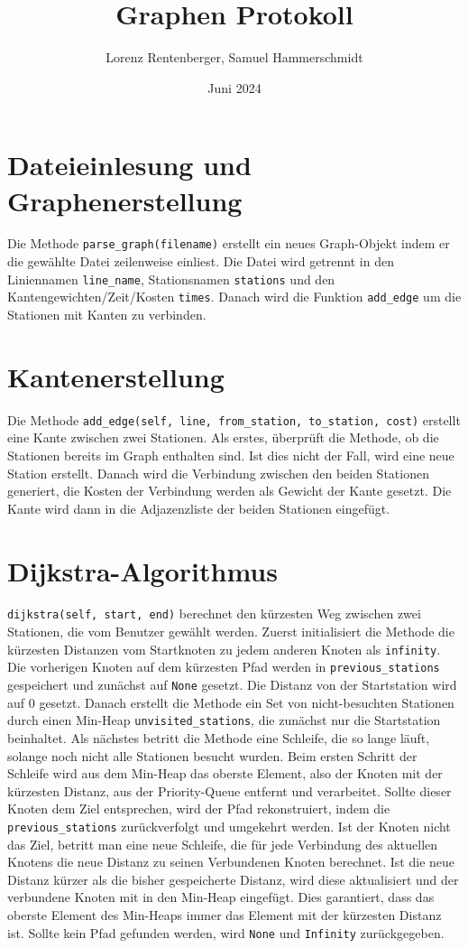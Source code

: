 \documentclass{article}
\title{Graphen Protokoll}
\author{Lorenz Rentenberger, Samuel Hammerschmidt}
\date{Juni 2024}
\begin{document}
\maketitle

\section*{Dateieinlesung und Graphenerstellung}
Die Methode \texttt{parse\_graph(filename)} erstellt ein neues Graph-Objekt indem er die gewählte Datei zeilenweise einliest. Die Datei wird getrennt in den Liniennamen \texttt{line\_name}, Stationsnamen \texttt{stations} und den Kantengewichten/Zeit/Kosten \texttt{times}.
Danach wird die Funktion \texttt{add\_edge} um die Stationen mit Kanten zu verbinden.

\section*{Kantenerstellung}
Die Methode \texttt{add\_edge(self, line, from\_station, to\_station, cost)} erstellt eine Kante zwischen zwei Stationen. Als erstes, überprüft die Methode, ob die Stationen bereits im Graph enthalten sind. Ist dies nicht der Fall, wird eine neue Station erstellt.
Danach wird die Verbindung zwischen den beiden Stationen generiert, die Kosten der Verbindung werden als Gewicht der Kante gesetzt. Die Kante wird dann in die Adjazenzliste der beiden Stationen eingefügt.

\section*{Dijkstra-Algorithmus}
\texttt{dijkstra(self, start, end)} berechnet den kürzesten Weg zwischen zwei Stationen, die vom Benutzer gewählt werden. Zuerst initialisiert die Methode die kürzesten Distanzen vom Startknoten zu jedem anderen Knoten als \texttt{infinity}. Die vorherigen Knoten auf dem kürzesten Pfad werden in \texttt{previous\_stations} gespeichert und zunächst auf \texttt{None} gesetzt.
Die Distanz von der Startstation wird auf 0 gesetzt. Danach erstellt die Methode ein Set von nicht-besuchten Stationen durch einen Min-Heap \texttt{unvisited\_stations}, die zunächst nur die Startstation beinhaltet. Als nächstes betritt die Methode eine Schleife, die so lange läuft, solange noch nicht alle Stationen besucht wurden. Beim ersten Schritt der Schleife wird aus dem Min-Heap das oberste Element, also der Knoten mit der kürzesten Distanz, aus der Priority-Queue entfernt und verarbeitet.
Sollte dieser Knoten dem Ziel entsprechen, wird der Pfad rekonstruiert, indem die \texttt{previous\_stations} zurückverfolgt und umgekehrt werden. Ist der Knoten nicht das Ziel, betritt man eine neue Schleife, die für jede Verbindung des aktuellen Knotens die neue Distanz zu seinen Verbundenen Knoten berechnet. Ist die neue Distanz kürzer als die bisher gespeicherte Distanz, wird diese aktualisiert und der verbundene Knoten mit in den Min-Heap eingefügt. Dies garantiert, dass das oberste Element des Min-Heaps immer
das Element mit der kürzesten Distanz ist. Sollte kein Pfad gefunden werden, wird \texttt{None} und \texttt{Infinity} zurückgegeben.
\end{document}
